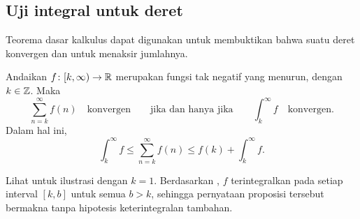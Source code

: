 \subsection{Uji integral untuk deret}

Teorema dasar
kalkulus dapat digunakan untuk membuktikan bahwa suatu deret konvergen dan untuk menaksir jumlahnya.

\begin{prop}
Andaikan $f \colon [k,\infty) \to {\mathbb{R}}$ merupakan fungsi tak negatif yang
menurun, dengan $k \in {\mathbb{Z}}$.  Maka
\begin{equation*}
\sum_{n=k}^\infty f(n)
\quad \text{konvergen} \qquad \text{jika dan hanya jika}
\qquad
\int_k^\infty f
\quad \text{konvergen}.
\end{equation*}
Dalam hal ini,
\begin{equation*}
\int_k^\infty f
\leq
\sum_{n=k}^\infty f(n)
\leq
f(k)+
\int_k^\infty f .
\end{equation*}
\end{prop}
Lihat  untuk ilustrasi dengan $k=1$.
Berdasarkan ,
$f$ terintegralkan
pada setiap interval $[k,b]$ untuk semua $b > k$, sehingga pernyataan proposisi tersebut
bermakna tanpa hipotesis keterintegralan tambahan.
\begin{myfigureht}
\caption{Luas di bawah kurva,
$\int_1^\infty f$, dibatasi dari bawah
oleh luas persegi panjang yang diarsir,
$f(2)+f(3)+f(4)+\cdots$, dan dibatasi dari atas
oleh luas seluruh persegi panjang, baik bagian yang diarsir maupun yang tidak,
$f(1)+f(2)+f(3)+\cdots$.\label{fig:integraltest}}
\end{myfigureht}

